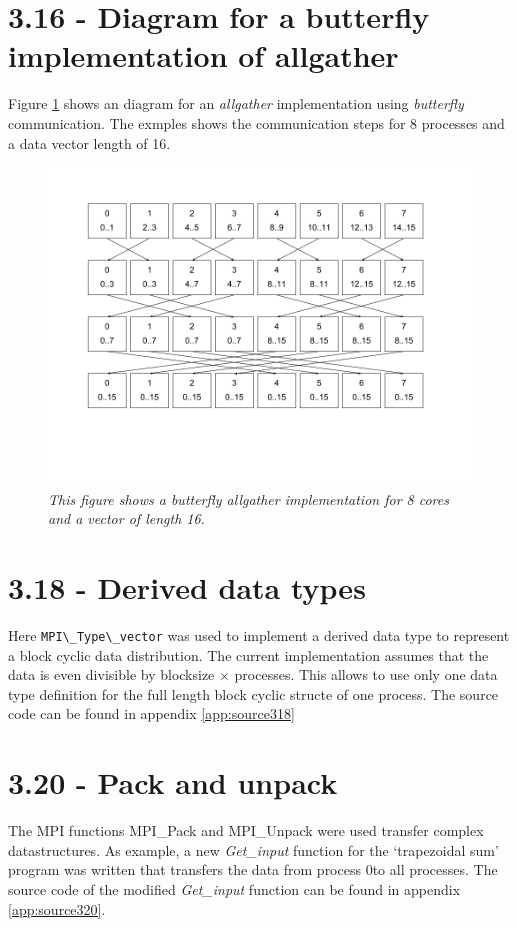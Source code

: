 \documentclass[a4paper,11pt,twoside]{article}
\begin{document}
\section{3.16 - Diagram for a butterfly implementation of allgather}
Figure \ref{fig:allgather} shows an diagram for an \textit{allgather} implementation using \textit{butterfly} communication. The exmples shows the communication steps for 8 processes and a data vector length of 16.  
\begin{figure}
  \centering
    \includegraphics[width=1\textwidth]{allgather.png}
    \caption{\textit{This figure shows a butterfly allgather implementation for 8 cores and a vector of length 16.}}
    \label{fig:allgather}
\end{figure}



\section{3.18 - Derived data types}
Here \verb+MPI\_Type\_vector+ was used to implement a derived data type to represent a block cyclic data distribution. The current implementation assumes that the data is even divisible by blocksize $\times$ processes. This allows to use only one data type definition for the full length block cyclic structe of one process. The source code can be found in appendix \ref{app:source318}

\section{3.20 - Pack and unpack}
The MPI functions MPI\_Pack and MPI\_Unpack were used transfer complex datastructures. As example, a new \textit{Get\_input} function for the `trapezoidal sum' program was written that transfers the data from process 0to all processes. The source code of the modified \textit{Get\_input} function can be found in appendix \ref{app:source320}.
\end{document}
